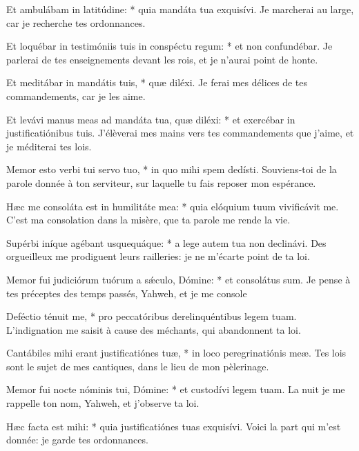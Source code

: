 \begin{paracol}{2}
\LigneParacol
{Et ambulábam in latitúdine: * quia mandáta tua exquisívi.}
{Je marcherai au large, car je recherche tes ordonnances.}

\LigneParacol
{Et loquébar in testimóniis tuis in conspéctu regum: * et non confundébar.}
{Je parlerai de tes enseignements devant les rois, et je n'aurai point de honte.}

\LigneParacol
{Et meditábar in mandátis tuis, * quæ diléxi.}
{Je ferai mes délices de tes commandements, car je les aime.}

\LigneParacol
{Et levávi manus meas ad mandáta tua, quæ diléxi: * et exercébar in justificatiónibus tuis.}
{J'élèverai mes mains vers tes commandements que j'aime, et je méditerai tes lois. }

\LigneParacol
{Memor esto verbi tui servo tuo, * in quo mihi spem dedísti.}
{Souviens-toi de la parole donnée à ton serviteur, sur laquelle tu fais reposer mon espérance.}

\LigneParacol
{Hæc me consoláta est in humilitáte mea: * quia elóquium tuum vivificávit me.}
{C'est ma consolation dans la misère, que ta parole me rende la vie.}

\LigneParacol
{Supérbi iníque agébant usquequáque: * a lege autem tua non declinávi.}
{Des orgueilleux me prodiguent leurs railleries: je ne m'écarte point de ta loi.}

\LigneParacol
{Memor fui judiciórum tuórum a sǽculo, Dómine: * et consolátus sum.}
{Je pense à tes préceptes des temps passés, Yahweh, et je me console}

\LigneParacol
{Deféctio ténuit me, * pro peccatóribus derelinquéntibus legem tuam.}
{L'indignation me saisit à cause des méchants, qui abandonnent ta loi.}

\LigneParacol
{Cantábiles mihi erant justificatiónes tuæ, * in loco peregrinatiónis meæ.}
{Tes lois sont le sujet de mes cantiques, dans le lieu de mon pèlerinage.}

\LigneParacol
{Memor fui nocte nóminis tui, Dómine: * et custodívi legem tuam.}
{La nuit je me rappelle ton nom, Yahweh, et j'observe ta loi.}

\LigneParacol
{Hæc facta est mihi: * quia justificatiónes tuas exquisívi.}
{Voici la part qui m'est donnée: je garde tes ordonnances.}

\end{paracol}
